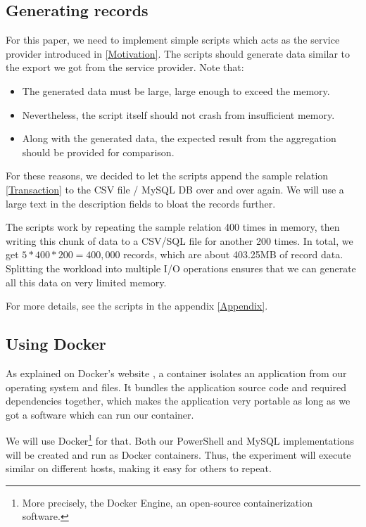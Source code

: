 \subsection{Generating records} \label{Generating records}

For this paper, we need to implement simple scripts which acts as the
service provider introduced in \ref{Motivation}. The scripts
should generate data similar to the export we got from
the service provider. Note that:
\begin{itemize}
    \item The generated data must be large, large enough to exceed
        the memory.
    \item Nevertheless, the script itself should not crash from
        insufficient memory.
    \item Along with the generated data, the expected result from the
        aggregation should be provided for comparison.
\end{itemize}
For these reasons, we decided to let the scripts append the
sample relation \ref{Transaction} to the \gls{CSV} file / \gls{MySQL} \gls{DB}
over and over again. We will use a large text in the description
fields to bloat the records further.

The scripts work by repeating the sample relation 400 times in memory,
then writing this chunk of data to a \gls{CSV}/\gls{SQL} file for another 200 times.
In total, we get $5*400*200=400,000$ records, which are about 403.25MB
of record data. Splitting the workload into multiple \gls{I/O} operations
ensures that we can generate all this data on very limited memory.

For more details, see the scripts in the appendix \ref{Appendix}.

\subsection{Using Docker}

As explained on Docker's website \cite{docContainer}, a container isolates
an application from our operating system and files.
It bundles the application source code and
required dependencies together, which makes the application
very portable as long as we got a software which can run our container.

We will use Docker\footnote{More precisely, the Docker Engine, an open-source containerization software.}
for that. Both our \gls{PowerShell} and MySQL implementations
will be created and run as Docker containers. Thus,
the experiment will execute similar on different hosts, making
it easy for others to repeat.


